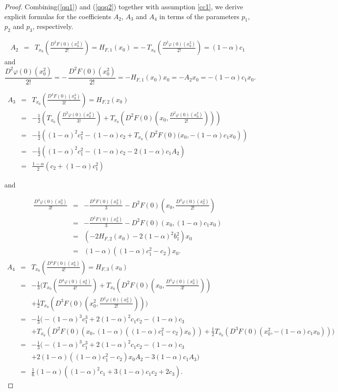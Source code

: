 \documentclass[10pt,a4paper]{amsart}
\newcommand{\bea}{\begin{eqnarray}}
\newcommand{\beas}{\begin{eqnarray*}}
\newcommand{\eea}{\end{eqnarray}}
\newcommand{\eeas}{\end{eqnarray*}}
\begin{document}
\begin{proof}
Combining(\ref{qq1}) and (\ref{qqq2}) together with assumption \eqref{cc1}, we derive explicit formulas for the coefficients \(A_2\), \(A_3\)  and \(A_4\) in terms of the parameters \(p_1\), \(p_2\) and  \(p_3\), respectively.


\bea\label{A2}A_2&=&T_{x_0}\!\left(\frac{D^2F(0)(x_0^2)}{2!}\right)=H_{F,1}(x_0)
=-\,T_{x_0}\!\left(\frac{D^2\varphi(0)(x_0^2)}{2!}\right)
=(1-\alpha)c_1\eea
and
\[
\frac{D^2\varphi(0)(x_0^2)}{2!}=-\,\frac{D^2F(0)(x_0^2)}{2!}=-H_{F,1}(x_0)x_0
=-A_2x_0
=-(1-\alpha)c_1x_0.
\]

\bea\label{A3} A_3&=&T_{x_0}\!\left(\frac{D^3F(0)(x_0^3)}{3!}\right)
=H_{F,2}(x_0) \nonumber\\
&=&-\frac{1}{2}\left(T_{x_0}\!\left(\frac{D^3\varphi(0)(x_0^3)}{3!}\right)
+T_{x_0}\!\left(D^2F(0)\!\left(x_0,\frac{D^2\varphi(0)(x_0^2)}{2!}\right)\right)\right) \nonumber\\
&=&-\frac{1}{2}\left((1-\alpha)^2 c_1^2-(1-\alpha)c_2+T_{x_0}\!\left(D^2F(0)(x_0,-(1-\alpha)c_1x_0\right)\right) \nonumber\\
&=&-\frac{1}{2}\left((1-\alpha)^2 c_1^2-(1-\alpha)c_2-2(1-\alpha)c_1A_2\right)\nonumber\\
&=&\frac{1-\alpha}{2}\left(c_2+(1-\alpha) c_1^2\right)
\eea

and

\beas 
\frac{D^3\varphi(0)(x_0^3)}{3!}&=&-\frac{D^3F(0)(x_0^3)}{3}-D^2F(0)\!\left(x_0,\frac{D^2\varphi(0)(x_0^2)}{2!}\right)\\
&=&-\frac{D^3F(0)(x_0^3)}{3}-D^2F(0)(x_0,(1-\alpha) c_1 x_0)\\
&=&\left(-2H_{F,2}(x_0)-2(1-\alpha)^2 b_1^2\right) x_0\\
&=&(1-\alpha)((1-\alpha)c_1^2-c_2)x_0.\eeas
\bea\label{A4}
A_4&=& T_{x_0}\!\left(\frac{D^4F(0)(x_0^4)}{4!}\right)=H_{F,3}(x_0) \nonumber\\
&=&-\frac{1}{3}\Bigg(T_{x_0}\!\left(\frac{D^4\varphi(0)(x_0^4)}{4!}\right)+T_{x_0}\!\left(D^2F(0)\!\left(x_0,\frac{D^3\varphi(0)(x_0^3)}{3!}\right)\right) \nonumber\\
&& +\frac{1}{2}T_{x_0}\!\left(D^3F(0)\!\left(x_0^2,\frac{D^2\varphi(0)(x_0^2)}{2!}\right)\right)\Bigg) \nonumber\\
&=&-\frac{1}{3}\Bigg(-(1-\alpha)^3 c_1^3+2(1-\alpha)^2 c_1c_2-(1-\alpha)c_3 \nonumber\\
&&+
T_{x_0}\!\left(D^2F(0)(x_0,(1-\alpha)((1-\alpha)c_1^2-c_2)x_0)\right)+\frac{1}{2}T_{x_0}\!\left(D^3F(0)(x_0^2,-(1-\alpha)c_1x_0)\right)\Bigg) \nonumber\\
&=&-\frac{1}{3}\Bigg(-(1-\alpha)^3 c_1^3+2(1-\alpha)^2 c_1c_2-(1-\alpha)c_3\nonumber\\
&&+2(1-\alpha)((1-\alpha)c_1^2-c_2)x_0A_2-3(1-\alpha)c_1A_3\Big) \nonumber\\
&=&\frac{1}{6}(1-\alpha)\left((1-\alpha)^2 c_1 +3(1-\alpha)c_1c_2+2c_3\right).\eea
\end{proof}
\end{document}
